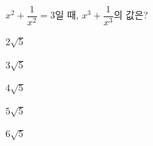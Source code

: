 $x^2+\dfrac{1}{x^2}=3$일 때, $x^3+\dfrac{1}{x^3}$의 값은? 
\begin{choices32}{\rule[-3ex]{0pt}{8ex}$2\sqrt{5}$}{\rule[-3ex]{0pt}{8ex}$3\sqrt{5}$}{\rule[-3ex]{0pt}{8ex}$4\sqrt{5}$}{\rule[-3ex]{0pt}{8ex}$5\sqrt{5}$}{\rule[-3ex]{0pt}{8ex}$6\sqrt{5}$}\end{choices32}
